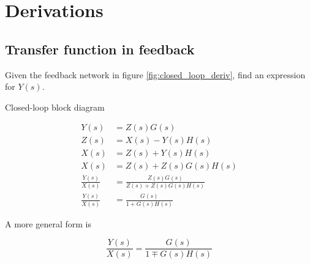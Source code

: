 
\chapter{Derivations}

\section{Transfer function in feedback}
\label{sec:deriv_tf_feedback}

Given the feedback network in figure \ref{fig:closed_loop_deriv}, find an
expression for $Y(s)$.

\begin{bookfigure}

  \caption{Closed-loop block diagram}
  \label{fig:closed_loop_deriv}
\end{bookfigure}

\begin{align}
  Y(s) &= Z(s) G(s) \nonumber \\
  Z(s) &= X(s) - Y(s) H(s) \nonumber \\
  X(s) &= Z(s) + Y(s) H(s) \nonumber \\
  X(s) &= Z(s) + Z(s) G(s) H(s) \nonumber \\
  \frac{Y(s)}{X(s)} &= \frac{Z(s) G(s)}{Z(s) + Z(s) G(s) H(s)} \nonumber \\
  \frac{Y(s)}{X(s)} &= \frac{G(s)}{1 + G(s) H(s)}
\end{align}

A more general form is

\begin{equation}
  \frac{Y(s)}{X(s)} = \frac{G(s)}{1 \mp G(s) H(s)}
\end{equation}


